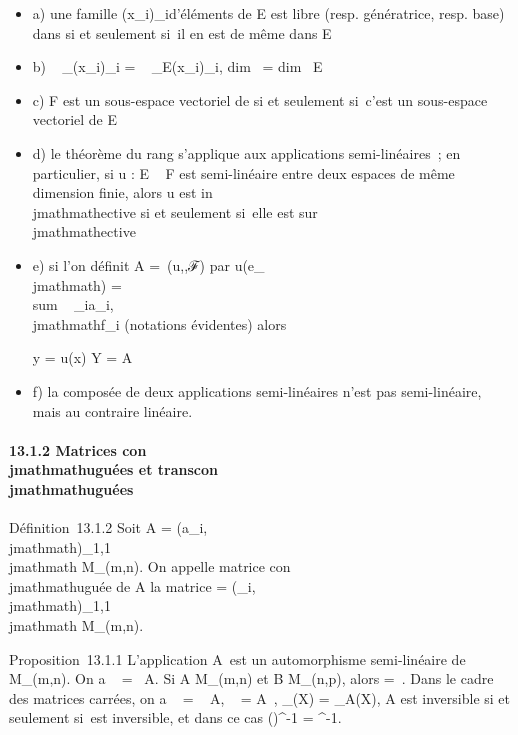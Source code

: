 \documentclass[]{article}
\begin{document}
\begin{itemize}
\item
  a) une famille (x_i)_i\inI d'éléments de E est libre
  (resp. génératrice, resp. base) dans \checkE si et
  seulement si~il en est de même dans E
\item
  b) \mathrmrg~
  _\checkE(x_i)_i\inI
  = \mathrmrg~
  _E(x_i)_i\inI, dim~
  \checkE = dim~ E
\item
  c) F est un sous-espace vectoriel de \checkE si et
  seulement si~c'est un sous-espace vectoriel de E
\item
  d) le théorème du rang s'applique aux applications semi-linéaires~; en
  particulier, si u : E \rightarrow~ F est semi-linéaire entre deux espaces de même
  dimension finie, alors u est in\\jmathmathective si et seulement si~elle est
  sur\\jmathmathective
\item
  e) si l'on définit A =\
  \mathrmMat (u,,ℱ) par u(e_\\jmathmath)
  = \\sum ~
  _ia_i,\\jmathmathf_i (notations évidentes) alors

  y = u(x) \Leftrightarrow Y =
  A\overlineX
\item
  f) la composée de deux applications semi-linéaires n'est pas
  semi-linéaire, mais au contraire linéaire.
\end{itemize}

\paragraph{13.1.2 Matrices con\\jmathmathuguées et transcon\\jmathmathuguées}

Définition~13.1.2 Soit A = (a_i,\\jmathmath)_1\leqi\leqm,1\leq\\jmathmath\leqn \in
M_\mathbb{C}(m,n). On appelle matrice con\\jmathmathuguée de A la matrice
\overlineA =
(\overlinea_i,\\jmathmath)_1\leqi\leqm,1\leq\\jmathmath\leqn \in
M_\mathbb{C}(m,n).

Proposition~13.1.1 L'application
A\mapsto~\overlineA est un
automorphisme semi-linéaire de M_(m,n). On a
\mathrmrg\overlineA~
= \mathrmrg~A. Si A \in
M_(m,n) et B \in M_(n,p), alors
\overlineAB =
\overlineA\,\overlineB.
Dans le cadre des matrices carrées, on a
~
\overlineA =
\overline{}~
A,
\overlineA~
=
\overline{}A~,
\chi_\overlineA(X) =
\overline\chi_A(X), A est inversible si et
seulement si~\overlineA est inversible, et dans ce
cas (\overlineA)^-1 =
\overlineA^-1.
\end{document}
